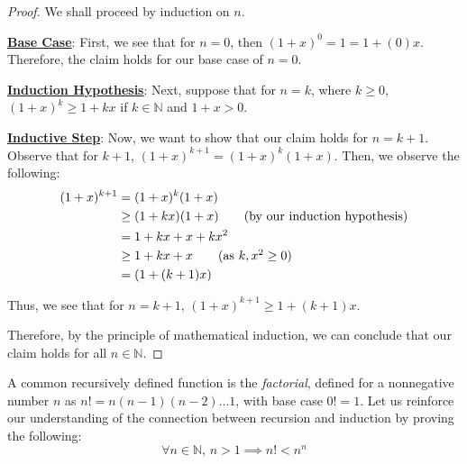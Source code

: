 \documentclass[openany]{book}
\newcommand{\NN}{\mathbb{N}}
\begin{document}
\begin{proof}
	We shall proceed by induction on $n$.
	
	\underline{\textbf{Base Case}}: First, we see that for $n=0$, then $(1+x)^{0} = 1 = 1+(0)x$. Therefore, the claim holds for our base case of $n=0$.
	
	\textbf{\underline{Induction Hypothesis}}: Next, suppose that for $n=k$, where $k \geq 0$, $(1+x)^{k} \geq 1+kx$ if $k \in \NN$ and $1+x > 0$.
	
	\textbf{\underline{Inductive Step}}: Now, we want to show that our claim holds for $n=k+1$. Observe that for $k+1$, $(1+x)^{k+1}=(1+x)^{k}(1+x)$. Then, we observe the following:
	\begin{align*}
		(1+x)^{k+1} &= (1+x)^{k}(1+x) \\
		&\geq (1+kx)(1+x) \tag{by our induction hypothesis} \\
		&= 1+kx+x+kx^{2} \\
		&\geq 1 + kx + x \tag{as $k, x^{2} \geq 0$} \\
		&= (1+(k+1)x)
	\end{align*}

	Thus, we see that for $n=k+1$, $(1+x)^{k+1} \geq 1+(k+1)x$.
	
	Therefore, by the principle of mathematical induction, we can conclude that our claim holds for all $n \in \NN$.
\end{proof}
\begin{hw}
	A common recursively defined function is the \textit{factorial}, defined for a nonnegative number $n$ as $n! = n(n-1)(n-2) \ldots 1$, with base case $0! = 1$. Let us reinforce our understanding of the connection between recursion and induction by proving the following:
	\begin{equation*}
		\forall n \in \NN\text{, }n > 1 \implies n! < n^{n}
	\end{equation*}
\end{hw}
\end{document}

